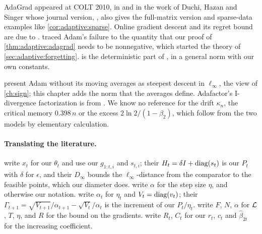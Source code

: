 \begin{refsection}
\begin{exercises}
\end{exercises}

\notesandrefs
AdaGrad appeared at COLT 2010, in \textcite{McMahanStreeter2010} and in the work of Duchi, Hazan and Singer whose journal version, \textcite{DuchiHazanSinger2011}, also gives the full-matrix version and sparse-data examples like \cref{cor:adaptive:sparse}. Online gradient descent and its regret bound are due to \textcite{Zinkevich2003}. \Textcite{ReddiKaleKumar2018} traced Adam's failure to the quantity that our proof of \cref{thm:adaptive:adagrad} needs to be nonnegative, which started the theory of \cref{sec:adaptive:forgetting}.  is the deterministic part of \textcite{WardWuBottou2019}, in a general norm with our own constants.

\Textcite{BernsteinNewhouse2024} present Adam without its moving averages as steepest descent in $\ell_\infty$, the view of \cref{ch:sign}; this chapter adds the norm that the averages define. Adafactor's I-divergence factorization is from \textcite{ShazeerStern2018}. We know no reference for the drift $\kappa_n$, the critical memory $0.398\,n$ or the excess $2\ln2/(1-\beta_2)$, which follow from the two models by elementary calculation.

\paragraph{Translating the literature.} \Textcite{DuchiHazanSinger2011} write $x_t$ for our $\theta_t$ and use our $g_{1:t,i}$ and $s_{t,i}$; their $H_t=\delta I+\operatorname{diag}(s_t)$ is our $P_t$ with $\delta$ for $\epsilon$, and their $D_\infty$ bounds the $\ell_\infty$-distance from the comparator to the feasible points, which our diameter does. \Textcite{KingmaBa2015} write $\alpha$ for the step size $\eta$, and otherwise our notation. \Textcite{ReddiKaleKumar2018} write $\alpha_t$ for $\eta_t$ and $V_t=\operatorname{diag}(v_t)$; their $\Gamma_{t+1}=\sqrt{V_{t+1}}/\alpha_{t+1}-\sqrt{V_t}/\alpha_t$ is the increment of our $P_t/\eta_t$. \Textcite{DefossezEtAl2022} write $F$, $N$, $\alpha$ for $\mathcal{L}$, $T$, $\eta$, and $R$ for the bound on the gradients. \Textcite{ShazeerStern2018} write $R_t$, $C_t$ for our $r_t$, $c_t$ and $\hat\beta_{2t}$ for the increasing coefficient.

\printchapterbib
\end{refsection}
